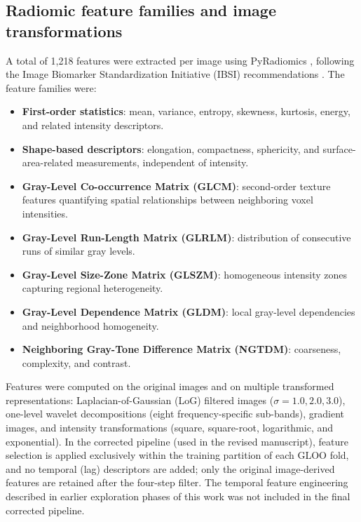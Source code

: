 \documentclass[fleqn,10pt]{wlscirep}
\begin{document}
\subsection*{Radiomic feature families and image transformations}

A total of 1,218 features were extracted per image using PyRadiomics \cite{pyradiomics}, following the Image Biomarker Standardization Initiative (IBSI) recommendations \cite{Zwanenburg_2020}. The feature families were:

\begin{itemize}
\item \textbf{First-order statistics}: mean, variance, entropy, skewness, kurtosis, energy, and related intensity descriptors.
\item \textbf{Shape-based descriptors}: elongation, compactness, sphericity, and surface-area-related measurements, independent of intensity.
\item \textbf{Gray-Level Co-occurrence Matrix (GLCM)}: second-order texture features quantifying spatial relationships between neighboring voxel intensities.
\item \textbf{Gray-Level Run-Length Matrix (GLRLM)}: distribution of consecutive runs of similar gray levels.
\item \textbf{Gray-Level Size-Zone Matrix (GLSZM)}: homogeneous intensity zones capturing regional heterogeneity.
\item \textbf{Gray-Level Dependence Matrix (GLDM)}: local gray-level dependencies and neighborhood homogeneity.
\item \textbf{Neighboring Gray-Tone Difference Matrix (NGTDM)}: coarseness, complexity, and contrast.
\end{itemize}

Features were computed on the original images and on multiple transformed representations: Laplacian-of-Gaussian (LoG) filtered images ($\sigma = 1.0, 2.0, 3.0$), one-level wavelet decompositions (eight frequency-specific sub-bands), gradient images, and intensity transformations (square, square-root, logarithmic, and exponential). In the corrected pipeline (used in the revised manuscript), feature selection is applied exclusively within the training partition of each GLOO fold, and no temporal (lag) descriptors are added; only the original image-derived features are retained after the four-step filter. The temporal feature engineering described in earlier exploration phases of this work was not included in the final corrected pipeline.
\end{document}
